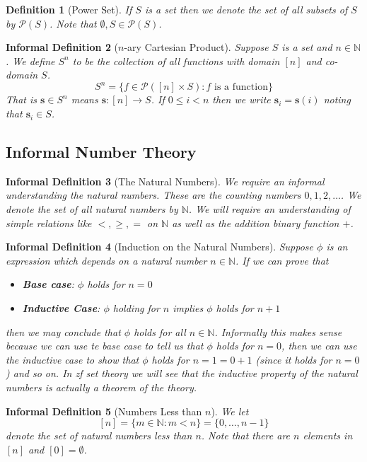 \documentclass[12pt]{article}
\theoremstyle{break}
\newtheorem{definition}{Definition}[section]
\theoremstyle{break}
\theoremstyle{break}
\theoremstyle{break}
\theoremstyle{break}
\newtheorem{informal definition}[definition]{Informal Definition}
\theoremstyle{break}
\newtheorem{informal theorem}[theorem]{Informal Theorem}
\newcommand{\bv}[1]{\boldsymbol{#1}}
\newcommand{\mc}[1]{\mathcal{#1}}
\newcommand{\natnum}[0]{\mathbb{N}}
\begin{document}
\begin{definition}[Power Set]
If $S$ is a set then we denote the set of all subsets of $S$ by $\mc{P}(S)$.
Note that $\emptyset, S \in \mc{P}(S)$.
\end{definition}

\begin{informal definition}[$n$-ary Cartesian Product]
Suppose $S$ is a set and $n\in \natnum$.
We define $S^n$ to be the collection of all functions with domain $[n]$ and co-domain $S$.
$$
S^n = \{f \in \mc{P}([n]\times S): f \text{ is a function}\}
$$
That is $\bv{s} \in S^n$ means $\bv{s}: [n] \to S$.
If $0 \le i < n$ then we write $\bv{s}_i = \bv{s}(i)$ noting that $\bv{s}_i \in S$.
\end{informal definition}

\subsection{Informal Number Theory}

\begin{informal definition}[The Natural Numbers]
We require an informal understanding the natural numbers.
These are the counting numbers $0, 1, 2, \ldots$.
We denote the set of all natural numbers by $\natnum$.
We will require an understanding of simple relations like $<, \ge, =$ on $\natnum$ as well as the addition binary function $+$.
\end{informal definition}

\begin{informal definition}[Induction on the Natural Numbers]
Suppose $\phi$ is an expression which depends on a natural number $n \in \natnum$.
If we can prove that
\begin{itemize}
\item{\textbf{Base case}: $\phi$ holds for $n = 0$}
\item{\textbf{Inductive Case}: $\phi$ holding for $n$ implies $\phi$ holds for $n+1$}
\end{itemize}
then we may conclude that $\phi$ holds for all $n \in \natnum$.
Informally this makes sense because we can use te base case to tell us that $\phi$ holds for $n=0$, then we can use the inductive case to show that $\phi$ holds for $n=1 = 0 + 1$ (since it holds for $n=0$) and so on.
In \gls{zf} set theory we will see that the inductive property of the natural numbers is actually a theorem of the theory.
\end{informal definition}

\begin{informal definition}[Numbers Less than $n$]
We let
$$
[n] = \{m \in \natnum: m < n\} = \{0, \ldots, n-1\}
$$
denote the set of natural numbers less than $n$.
Note that there are $n$ elements in $[n]$ and $[0] = \emptyset$.
\end{informal definition}
\end{document}
